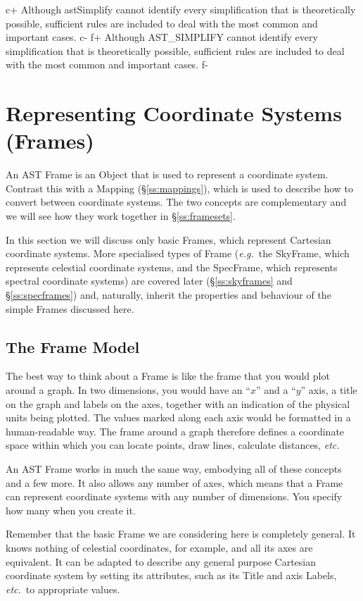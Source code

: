 \documentclass[twoside,11pt]{starlink}
\providecommand{\secref}[1]{\S\ref{#1}}
\begin{document}
c+
Although astSimplify cannot identify every simplification that is
theoretically possible, sufficient rules are included to deal with the
most common and important cases.
c-
f+
Although AST\_SIMPLIFY cannot identify every simplification that is
theoretically possible, sufficient rules are included to deal with the
most common and important cases.
f-

\cleardoublepage
\section{\label{ss:frames}Representing Coordinate Systems (Frames)}

An AST Frame is an Object that is used to represent a coordinate
system. Contrast this with a Mapping (\secref{ss:mappings}), which is
used to describe how to convert between coordinate systems. The two
concepts are complementary and we will see how they work together in
\secref{ss:framesets}.

In this section we will discuss only basic Frames, which represent
Cartesian coordinate systems. More specialised types of Frame
(\emph{e.g.}\ the SkyFrame, which represents celestial coordinate
systems, and the SpecFrame, which represents spectral coordinate
systems) are covered later (\secref{ss:skyframes} and \secref{ss:specframes})
and, naturally, inherit the properties and behaviour of the simple Frames
discussed here.

\subsection{The Frame Model}

The best way to think about a Frame is like the frame that you would
plot around a graph. In two dimensions, you would have an ``$x$'' and
a ``$y$'' axis, a title on the graph and labels on the axes, together
with an indication of the physical units being plotted. The values
marked along each axis would be formatted in a human-readable way. The
frame around a graph therefore defines a coordinate space within which
you can locate points, draw lines, calculate distances, \emph{etc.}

An AST Frame works in much the same way, embodying all of these
concepts and a few more. It also allows any number of axes, which
means that a Frame can represent coordinate systems with any number of
dimensions. You specify how many when you create it.

Remember that the basic Frame we are considering here is completely
general.  It knows nothing of celestial coordinates, for example, and
all its axes are equivalent. It can be adapted to describe any general
purpose Cartesian coordinate system by setting its attributes, such as
its Title and axis Labels, \emph{etc.}\ to appropriate values.
\end{document}
